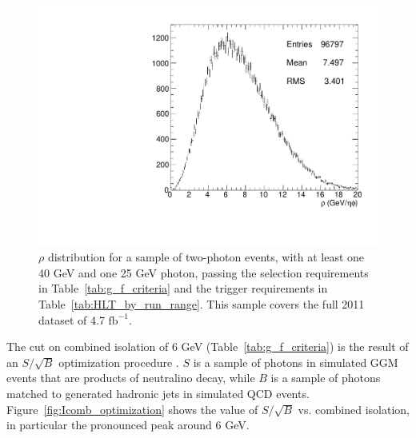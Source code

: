 \documentclass[dissertation.tex]{subfiles}
\begin{document}
\begin{figure}
	\centering
	\includegraphics[scale=0.3]{preselected_rho}
	\caption{$\rho$ distribution for a sample of two-photon events, with at least one 40 GeV and one 25 GeV photon, passing the selection requirements in Table~\ref{tab:g_f_criteria} and the trigger requirements in Table~\ref{tab:HLT_by_run_range}.  This sample covers the full 2011 dataset of 4.7 $\mbox{fb}^{-1}$.}
	\label{fig:preselected_rho}
\end{figure}

\marginpar{\textcolor{blue}{New}}The cut on combined isolation of 6 GeV (Table~\ref{tab:g_f_criteria}) is the result of an $S/\sqrt{B}$ optimization procedure \cite{CMS_AN-2011-515}.  $S$ is a sample of photons in simulated GGM events that are products of neutralino decay, while $B$ is a sample of photons matched to generated hadronic jets in simulated QCD events.  Figure~\ref{fig:Icomb_optimization} shows the value of $S/\sqrt{B}$ vs. combined isolation, in particular the pronounced peak around 6 GeV.
\end{document}
